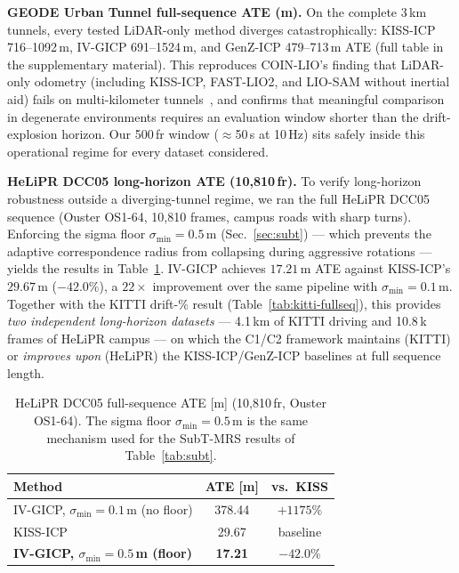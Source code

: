 \documentclass[journal,letterpaper,10pt]{IEEEtran}
\begin{document}
\textbf{GEODE Urban Tunnel full-sequence ATE (m).}
On the complete 3\,km tunnels, every tested LiDAR-only method diverges
catastrophically: KISS-ICP 716--1092\,m, IV-GICP 691--1524\,m, and
GenZ-ICP 479--713\,m ATE (full table in the supplementary material).
This reproduces COIN-LIO's finding that LiDAR-only odometry (including
KISS-ICP, FAST-LIO2, and LIO-SAM without inertial aid) fails on
multi-kilometer tunnels~\cite{pfreundschuh2024coinlio}, and confirms
that meaningful comparison in degenerate environments requires an
evaluation window shorter than the drift-explosion horizon. Our 500\,fr
window ($\approx$50\,s at 10\,Hz) sits safely inside this operational
regime for every dataset considered.

\textbf{HeLiPR DCC05 long-horizon ATE (10{,}810\,fr).}
To verify long-horizon robustness outside a diverging-tunnel regime, we
ran the full HeLiPR DCC05 sequence (Ouster OS1-64, 10{,}810 frames,
campus roads with sharp turns).  Enforcing the sigma floor
$\sigma_{\min}{=}0.5$\,m (Sec.~\ref{sec:subt}) --- which prevents the
adaptive correspondence radius from collapsing during aggressive
rotations --- yields the results in
Table~\ref{tab:helipr-fullseq}.
IV-GICP achieves $17.21$\,m ATE against KISS-ICP's $29.67$\,m
($\mathbf{-42.0\%}$), a $22{\times}$ improvement over the same pipeline
with $\sigma_{\min}{=}0.1$\,m.  Together with the KITTI drift-\%
result (Table~\ref{tab:kitti-fullseq}), this provides \emph{two
independent long-horizon datasets} --- 4.1\,km of KITTI driving and
10.8\,k frames of HeLiPR campus --- on which the C1/C2 framework
maintains (KITTI) or \emph{improves upon} (HeLiPR) the KISS-ICP/GenZ-ICP
baselines at full sequence length.

\begin{table}[h]
\centering
\small
\caption{HeLiPR DCC05 full-sequence ATE [m] (10{,}810\,fr, Ouster OS1-64).
The sigma floor $\sigma_{\min}{=}0.5$\,m is the
same mechanism used for the SubT-MRS results of Table~\ref{tab:subt}.}
\label{tab:helipr-fullseq}
\begin{tabular}{lcc}
\toprule
Method & ATE [m] & vs.\ KISS \\
\midrule
IV-GICP, $\sigma_{\min}{=}0.1$\,m (no floor) & 378.44 & $+1175\%$ \\
KISS-ICP                                      & 29.67  & baseline \\
\textbf{IV-GICP, $\sigma_{\min}{=}0.5$\,m (floor)} & \textbf{17.21} & $\mathbf{-42.0\%}$ \\
\bottomrule
\end{tabular}
\end{table}
\end{document}
